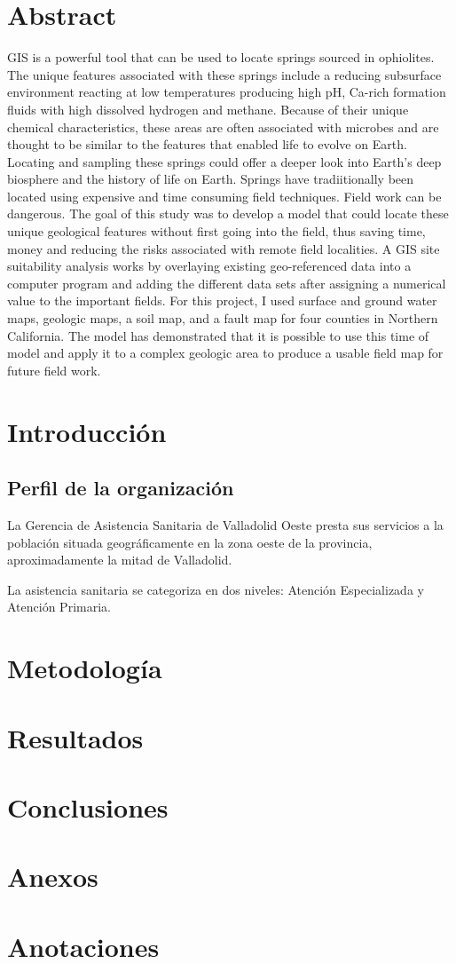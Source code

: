 \documentclass[12pt, a4paper]{report}
\begin{document}
\chapter*{Abstract}
GIS is a powerful tool that can be used to locate springs sourced in ophiolites. The unique features associated with these springs include a reducing subsurface environment reacting at low temperatures producing high pH, Ca-rich formation fluids with high dissolved hydrogen and methane. Because of their unique chemical characteristics, these areas are often associated with microbes and are thought to be similar to the features that enabled life to evolve on Earth. Locating and sampling these springs could offer a deeper look into Earth's deep biosphere and the history of life on Earth. Springs have tradiitionally been located using expensive and time consuming field techniques. Field work can be dangerous. The goal of this study was to develop a model that could locate these unique geological features without first going into the field, thus saving time, money and reducing the risks associated with remote field localities. A GIS site suitability analysis works by overlaying existing geo-referenced data into a computer program and adding the different data sets after assigning a numerical value to the important fields. For this project, I used surface and ground water maps, geologic maps, a soil map, and a fault map for four counties in Northern California. The model has demonstrated that it is possible to use this time of model and apply it to a complex geologic area to produce a usable field map for future field work.

\tableofcontents

\chapter{Introducción}

\section{Perfil de la organización}
La Gerencia de Asistencia Sanitaria de Valladolid Oeste presta sus servicios a la población situada geográficamente en la zona oeste de la provincia, aproximadamente la mitad de Valladolid.

La asistencia sanitaria se categoriza en dos niveles: Atención Especializada y Atención Primaria.

\chapter{Metodología}
\chapter{Resultados}
\chapter{Conclusiones}

\appendix
\chapter{Anexos}

\chapter{Anotaciones}
\end{document}
